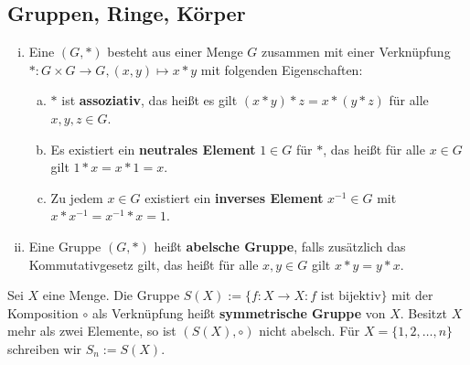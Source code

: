 \subsection{Gruppen, Ringe, Körper}
\begin{definition}[Gruppe]
	\label{def:I.4.1}
	\begin{enumerate}[(i)]
		\item Eine  $(G,*)$ besteht aus einer Menge $G$ zusammen mit einer Verknüpfung $*\colon G \times G \rightarrow G, (x,y) \mapsto x*y$ mit folgenden Eigenschaften:
		\begin{enumerate}[a)]
			\item $*$ ist \textbf{assoziativ}, das heißt es gilt $(x*y)*z = x * (y*z)$ für alle $x,y,z \in G$. 
			\item Es existiert ein \textbf{neutrales Element} $1 \in G$ für $*$, das heißt für alle $x \in G$ gilt $1 * x = x * 1 = x$. 
			\item Zu jedem $x \in G$ existiert ein \textbf{inverses Element} $x^{-1} \in G$ mit $x * x^{-1} = x^{-1} * x = 1$. 
		\end{enumerate}
		\item Eine Gruppe $(G,*)$ heißt \textbf{abelsche Gruppe}, falls zusätzlich das Kommutativgesetz gilt, das heißt für alle $x,y \in G$ gilt $x*y = y*x$. 
	\end{enumerate}
\end{definition}

\setcounter{satz}{3}
\begin{beispiel}
	\label{bsp:I.4.4}
	Sei $X$ eine Menge. Die Gruppe $S(X) := \{f \colon X \rightarrow X : f \text{ ist bijektiv}\}$ mit der Komposition $\circ$ als Verknüpfung heißt \textbf{symmetrische Gruppe} von $X$.
	Besitzt $X$ mehr als zwei Elemente, so ist $(S(X),\circ)$ nicht abelsch. Für $X = \{1,2,\dots,n\}$ schreiben wir $S_n := S(X)$. 
\end{beispiel}

